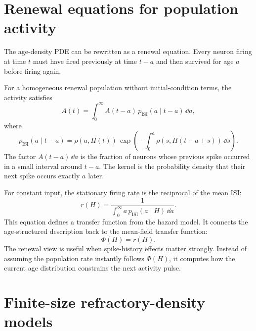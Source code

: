 \section{Renewal equations for population activity}
\label{sec:renewal-equations-population-activity}

The age-density PDE can be rewritten as a renewal equation. Every neuron firing at time $t$ must have fired previously at time $t-a$ and then survived for age $a$ before firing again.

For a homogeneous renewal population without initial-condition terms, the activity satisfies
%
\begin{equation}
  A(t)
  =
  \int_0^\infty
  A(t-a)\,
  p_{\mathrm{ISI}}(a\mid t-a)\,
  \dd a,
  \label{eq:renewal-equation-activity}
\end{equation}
%
where
%
\begin{equation}
  p_{\mathrm{ISI}}(a\mid t-a)
  =
  \rho(a,H(t))\,
  \exp\!\left(
    -\int_0^a
    \rho(s,H(t-a+s))\,\dd s
  \right).
  \label{eq:time-dependent-isi-kernel}
\end{equation}
%
The factor $A(t-a)\,\dd a$ is the fraction of neurons whose previous spike occurred in a small interval around $t-a$. The kernel is the probability density that their next spike occurs exactly $a$ later.

For constant input, the stationary firing rate is the reciprocal of the mean ISI:
%
\begin{equation}
  r(H)
  =
  \frac{1}{
    \int_0^\infty a\,p_{\mathrm{ISI}}(a\mid H)\,\dd a
  }.
  \label{eq:stationary-rate-from-isi}
\end{equation}
%
This equation defines a transfer function from the hazard model. It connects the age-structured description back to the mean-field transfer function:
%
\begin{equation}
  \Phi(H)=r(H).
  \label{eq:transfer-from-renewal}
\end{equation}
%
The renewal view is useful when spike-history effects matter strongly. Instead of assuming the population rate instantly follows $\Phi(H)$, it computes how the current age distribution constrains the next activity pulse.

\section{Finite-size refractory-density models}
\label{sec:finite-size-refractory-density-models}

